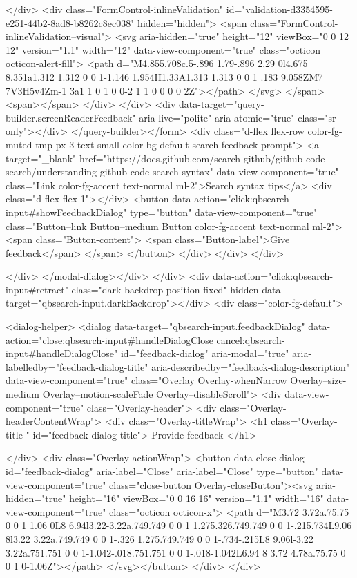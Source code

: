 {{        </div>
      <div class="FormControl-inlineValidation" id="validation-d3354595-e251-44b2-8ad8-b8262c8ec038" hidden="hidden">
        <span class="FormControl-inlineValidation--visual">
          <svg aria-hidden="true" height="12" viewBox="0 0 12 12" version="1.1" width="12" data-view-component="true" class="octicon octicon-alert-fill">
    <path d="M4.855.708c.5-.896 1.79-.896 2.29 0l4.675 8.351a1.312 1.312 0 0 1-1.146 1.954H1.33A1.313 1.313 0 0 1 .183 9.058ZM7 7V3H5v4Zm-1 3a1 1 0 1 0 0-2 1 1 0 0 0 0 2Z"></path>
</svg>
        </span>
        <span></span>
</div>    </div>
    <div data-target="query-builder.screenReaderFeedback" aria-live="polite" aria-atomic="true" class="sr-only"></div>
</query-builder></form>
          <div class="d-flex flex-row color-fg-muted tmp-px-3 text-small color-bg-default search-feedback-prompt">
            <a target="_blank" href="https://docs.github.com/search-github/github-code-search/understanding-github-code-search-syntax" data-view-component="true" class="Link color-fg-accent text-normal ml-2">Search syntax tips</a>            <div class="d-flex flex-1"></div>
              <button data-action="click:qbsearch-input#showFeedbackDialog" type="button" data-view-component="true" class="Button--link Button--medium Button color-fg-accent text-normal ml-2">  <span class="Button-content">
    <span class="Button-label">Give feedback</span>
  </span>
</button>
          </div>
        </div>
</div>

    </div>
</modal-dialog></div>
  </div>
  <div data-action="click:qbsearch-input#retract" class="dark-backdrop position-fixed" hidden data-target="qbsearch-input.darkBackdrop"></div>
  <div class="color-fg-default">
    
<dialog-helper>
  <dialog data-target="qbsearch-input.feedbackDialog" data-action="close:qbsearch-input#handleDialogClose cancel:qbsearch-input#handleDialogClose" id="feedback-dialog" aria-modal="true" aria-labelledby="feedback-dialog-title" aria-describedby="feedback-dialog-description" data-view-component="true" class="Overlay Overlay-whenNarrow Overlay--size-medium Overlay--motion-scaleFade Overlay--disableScroll">
    <div data-view-component="true" class="Overlay-header">
  <div class="Overlay-headerContentWrap">
    <div class="Overlay-titleWrap">
      <h1 class="Overlay-title " id="feedback-dialog-title">
        Provide feedback
      </h1>
        
    </div>
    <div class="Overlay-actionWrap">
      <button data-close-dialog-id="feedback-dialog" aria-label="Close" aria-label="Close" type="button" data-view-component="true" class="close-button Overlay-closeButton"><svg aria-hidden="true" height="16" viewBox="0 0 16 16" version="1.1" width="16" data-view-component="true" class="octicon octicon-x">
    <path d="M3.72 3.72a.75.75 0 0 1 1.06 0L8 6.94l3.22-3.22a.749.749 0 0 1 1.275.326.749.749 0 0 1-.215.734L9.06 8l3.22 3.22a.749.749 0 0 1-.326 1.275.749.749 0 0 1-.734-.215L8 9.06l-3.22 3.22a.751.751 0 0 1-1.042-.018.751.751 0 0 1-.018-1.042L6.94 8 3.72 4.78a.75.75 0 0 1 0-1.06Z"></path>
</svg></button>
    </div>
  </div>
  
}}
